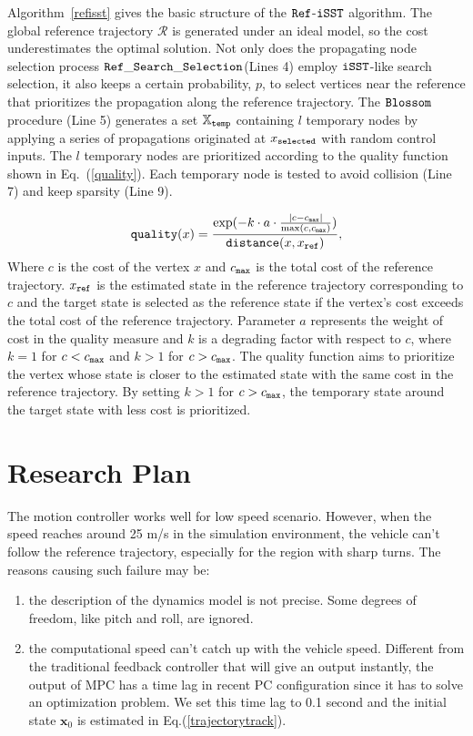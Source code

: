 \documentclass[conference, onecolumn]{IEEEtran}
\begin{document}
Algorithm~\ref{refisst} gives the basic structure of the $\tt Ref$-$\tt iSST$ algorithm. The global reference trajectory $\mathcal{R}$ is generated under an ideal model, so the cost underestimates the optimal solution. Not only does the propagating node selection process {$\tt Ref\_Search\_Selection$}(Lines 4) employ $\tt iSST$-like search selection, it also keeps a certain probability, $p$, to select vertices near the reference that prioritizes the propagation along the reference trajectory.
The $\tt Blossom$ procedure (Line 5) generates a set $\mathbb{X}_{\tt temp}$ containing $l$ temporary nodes by applying a series of propagations originated at $x_{\tt selected}$ with random control inputs. 
The $l$ temporary nodes are prioritized according to the quality function shown in Eq.~(\ref{quality}). Each temporary node is tested to avoid collision (Line 7) and keep sparsity (Line 9). %

\begin{equation}
	{\tt quality}(x) = 
		\frac{\exp(-k\cdot{a}\cdot{\frac{|c-c_{\tt max}|}{\max(c,c_{\tt max})})}}{{\tt distance}(x,x_{\tt ref})},
	\label{quality}
\end{equation}
Where $c$ is the cost of the vertex $x$ and $c_{\tt max}$ is the total cost of the reference trajectory. $x_{\tt ref}$ is the estimated state in the reference trajectory corresponding to $c$ and the target state is selected as the reference state if the vertex's cost exceeds the total cost of the reference trajectory. Parameter $a$ represents the weight of cost in the quality measure and $k$ is a degrading factor with respect to $c$, where $k=1$ for $c<c_{\tt max}$ and $k>1$ for $c>c_{\tt max}$. The quality function aims to prioritize the vertex whose state is closer to the estimated state with the same cost in the reference trajectory. By setting $k>1$ for $c>c_{\tt max}$, the temporary state around the target state with less cost is prioritized.

\section{Research Plan}
The motion controller works well for low speed scenario. However, when the speed reaches around 25 m/s in the simulation environment, the vehicle can't follow the reference trajectory, especially for the region with sharp turns. The reasons causing such failure may be:
\begin{enumerate}
	\item the description of the dynamics model is not precise. Some degrees of freedom, like pitch and roll, are ignored. 
	\item the computational speed can't catch up with the vehicle speed. Different from the traditional feedback controller that will give an output instantly, the output of MPC has a time lag in recent PC configuration since it has to solve an optimization problem. We set this time lag to 0.1 second and the initial state $\boldsymbol{x}_0$ is estimated in Eq.(\ref{trajectorytrack}).  
\end{enumerate}
\end{document}
